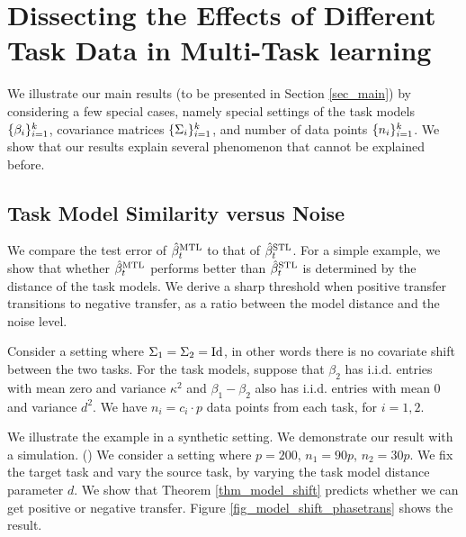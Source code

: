 \section{Dissecting the Effects of Different Task Data in Multi-Task learning}\label{sec_insight}

We illustrate our main results (to be presented in Section \ref{sec_main}) by considering a few special cases, namely special settings of the task models $\{\beta_i\}_{i=1}^k$, covariance matrices $\{\Sigma_i\}_{i=1}^k$, and number of data points $\{n_i\}_{i=1}^k$.
We show that our results explain several phenomenon that cannot be explained before.

\subsection{Task Model Similarity versus Noise}

We compare the test error of $\hat{\beta}_t^{\text{MTL}}$ to that of $\hat{\beta}_t^{\text{STL}}$.
For a simple example, we show that whether $\hat{\beta}_t^{\text{MTL}}$ performs better than $\hat{\beta}_t^{\text{STL}}$ is determined by the distance of the task models.
We derive a sharp threshold when positive transfer transitions to negative transfer, as a ratio between the model distance and the noise level.

\begin{example}\label{ex_basic}
	Consider a setting where $\Sigma_1 = \Sigma_2 = \operatorname{Id}$, in other words there is no covariate shift between the two tasks.
	For the task models, suppose that $\beta_2$ has i.i.d. entries with mean zero and variance $\kappa^2$ and $\beta_1 - \beta_2$ also has i.i.d. entries with mean $0$ and variance $d^2$.
	We have $n_i = c_i \cdot p$ data points from each task, for $i = 1, 2$.
\end{example}

We illustrate the example in a synthetic setting.
We demonstrate our result with a simulation. ()
We consider a setting where $p = 200$, $n_1 = 90p$, $n_2 = 30p$.
We fix the target task and vary the source task, by varying the task model distance parameter $d$.
We show that Theorem \ref{thm_model_shift} predicts whether we can get positive or negative transfer.
Figure \ref{fig_model_shift_phasetrans} shows the result.

